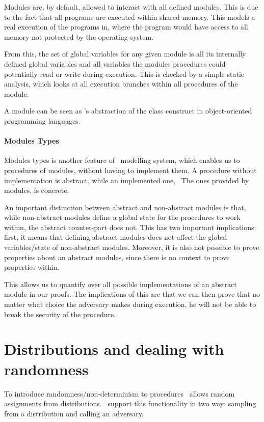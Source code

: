 Modules are, by default, allowed to interact with all defined modules.
This is due to the fact that all programs are executed within shared memory. This
models a real execution of the programs in, where the program would have access to
all memory not protected by the operating system.

From this, the set of global variables for any given module is all its
internally defined global variables and all variables the modules procedures
could potentially read or write during execution. This is checked by a simple
static analysis, which looks at all execution branches within all procedures of the module.

A module can be seen as \easycrypt's abstraction of the class construct
in object-oriented programming languages.

\paragraph{Modules Types}
\label{sec:ec_module_types}
Modules types is another feature of \easycrypt\ modelling system, which
enables us to procedures of modules, without having to implement
them. A procedure without implementation is abstract, while
an implemented one, \ie\ The ones provided by modules, is concrete.

An important distinction between abstract and non-abstract modules is that,
while non-abstract modules define a global state for the procedures to work
within, the abstract counter-part does not. This has two important implications;
first, it means that defining abstract modules does not affect the global
variables/state of non-abstract modules.
Moreover, it is also not possible to prove properties about an abstract modules, since
there is no context to prove properties within.

This allows us to quantify over all possible implementations of an abstract
module in our proofs.
The implications of this are that we can then prove that no matter what choice
the adversary makes during execution, he will not be able to break the security
of the procedure.

\section{Distributions and dealing with randomness}
\label{sec:easycrypt:distributions}
To introduce randomness/non-determinism to procedures \easycrypt\ allows
random assignments from distributions. \easycrypt\ support this functionality in
two way: sampling from a distribution and calling an adversary.

